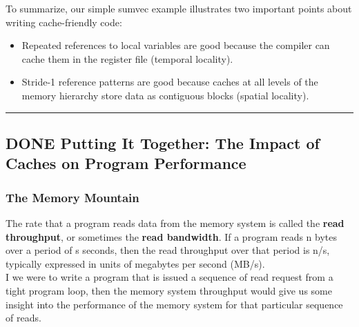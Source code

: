 \documentclass[11pt]{article}
\begin{document}
To summarize, our simple sumvec example illustrates two important points about writing cache-friendly code:\\
\begin{itemize}
\item Repeated references to local variables are good because the compiler can cache them in the register file (temporal locality).\\
\item Stride-1 reference patterns are good because caches at all levels of the memory hierarchy store data as contiguous blocks (spatial locality).\\
\end{itemize}

\noindent\rule{\textwidth}{0.5pt}

\subsection{{\bfseries\sffamily DONE} Putting It Together: The Impact of Caches on Program Performance}
\label{sec:org7ddfd29}

\subsubsection{The Memory Mountain}
\label{sec:org5dd6326}
The rate that a program reads data from the memory system is called the \textbf{read throughput}, or sometimes the \textbf{read bandwidth}. If a program reads n bytes over a period of s seconds, then the read throughput over that period is n/s, typically expressed in units of megabytes per second (MB/s).\\

I we were to write a program that is issued a sequence of read request from a tight program loop, then the memory system throughput would give us some insight into the performance of the memory system for that particular sequence of reads.\\
\end{document}

